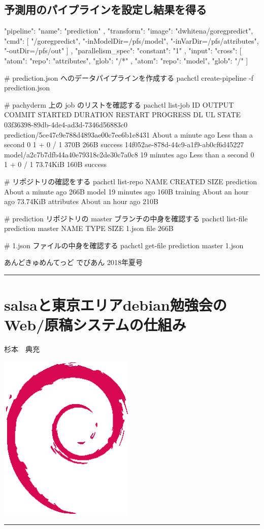 \documentclass[mingoth,a4paper]{jsarticle}
\renewcommand{\dancersection}[2]{%
\newpage
あんどきゅめんてっど でびあん 2018年夏号
%
\vspace{0.1mm}\\
{\color{dancerdarkblue}\rule{\hsize}{2mm}}

%
%
\begin{minipage}[t]{0.6\hsize}
\color{dancerdarkblue}
\vspace{1cm}
\section{#1}
\hfill{}#2\\
\end{minipage}
\begin{minipage}[t]{0.4\hsize}
\vspace{-2cm}
\hfill{}\includegraphics[height=8cm]{image200502/openlogo-nd.eps}\\
\vspace{-5cm}
\end{minipage}
%
{\color{dancerlightblue}\rule{0.66\hsize}{2mm}}
%
\vspace{2cm}
}
\begin{document}
\subsection{予測用のパイプラインを設定し結果を得る}

\begin{commandline}
{
  "pipeline": {
    "name": "prediction"
  },
  "transform": {
    "image": "dwhitena/goregpredict",
    "cmd": [
      "/goregpredict",
      "-inModelDir=/pfs/model",
      "-inVarDir=/pfs/attributes",
      "-outDir=/pfs/out"
    ]
  },
  "parallelism_spec": {
    "constant": "1"
  },
  "input": {
    "cross": [
    {
      "atom": {
        "repo": "attributes",
        "glob": "/*"
      }
    },
      {
        "atom": {
          "repo": "model",
          "glob": "/"
        }
      }
    ]
  }
}
\end{commandline}

\begin{commandline}
# prediction.json へのデータパイプラインを作成する
pachctl create-pipeline -f prediction.json

# pachyderm 上の job のリストを確認する
pachctl list-job
ID OUTPUT COMMIT STARTED DURATION RESTART PROGRESS DL UL STATE
03f36398-89db-4de4-ad3d-7346d56883c0
prediction/5ce47c9e788d4893ae00c7ee6b1e8431 About a minute ago Less than a
second 0 1 + 0 / 1 370B 266B success
14f052ae-878d-44c9-a1f9-ab0cf6d45227 model/a2c7b7dfb44a40e79318c2de30c7a0c8
19 minutes ago Less than a second 0 1 + 0 / 1 73.74KiB 160B success

# リポジトリの確認をする
pachctl list-repo
NAME CREATED SIZE
prediction About a minute ago 266B
model 19 minutes ago 160B
training About an hour ago 73.74KiB
attributes About an hour ago 210B

# prediction リポジトリの master ブランチの中身を確認する
pachctl list-file prediction master
NAME TYPE SIZE
1.json file 266B

# 1.json ファイルの中身を確認する
pachctl get-file prediction master 1.json
\end{commandline}


\dancersection{salsaと東京エリアdebian勉強会のWeb/原稿システムの仕組み}{杉本　典充}
\end{document}
